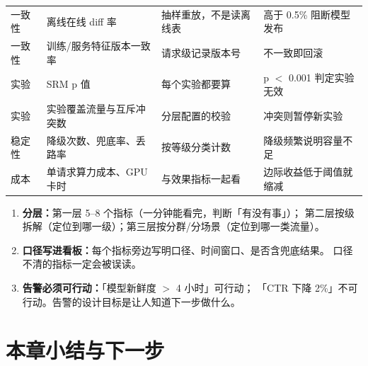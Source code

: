 \begin{table}[htbp]
\begin{tabularx}{\textwidth}{L{1.9cm} L{3.0cm} L{2.6cm} Y}
\addlinespace
一致性 & 离线在线 diff 率 & 抽样重放，不是读离线表 & 高于 0.5\% 阻断模型发布 \\
\addlinespace
一致性 & 训练/服务特征版本一致率 & 请求级记录版本号 & 不一致即回滚 \\
\addlinespace
实验 & SRM p 值 & 每个实验都要算 & p $<$ 0.001 判定实验无效 \\
\addlinespace
实验 & 实验覆盖流量与互斥冲突数 & 分层配置的校验 & 冲突则暂停新实验 \\
\addlinespace
稳定性 & 降级次数、兜底率、丢路率 & 按等级分类计数 & 降级频繁说明容量不足 \\
\addlinespace
成本 & 单请求算力成本、GPU 卡时 & 与效果指标一起看 & 边际收益低于阈值就缩减 \\
\bottomrule
\end{tabularx}
\end{table}

\begin{keypoint}[看板设计的三条原则]
\begin{enumerate}
  \item \textbf{分层：}第一层 5--8 个指标（一分钟能看完，判断「有没有事」）；
        第二层按级拆解（定位到哪一级）；第三层按分群/分场景（定位到哪一类流量）。
  \item \textbf{口径写进看板：}每个指标旁边写明口径、时间窗口、是否含兜底结果。
        口径不清的指标一定会被误读。
  \item \textbf{告警必须可行动：}「模型新鲜度 $>$ 4 小时」可行动；
        「CTR 下降 2\%」不可行动。告警的设计目标是让人知道下一步做什么。
\end{enumerate}
\end{keypoint}

\section{本章小结与下一步}

